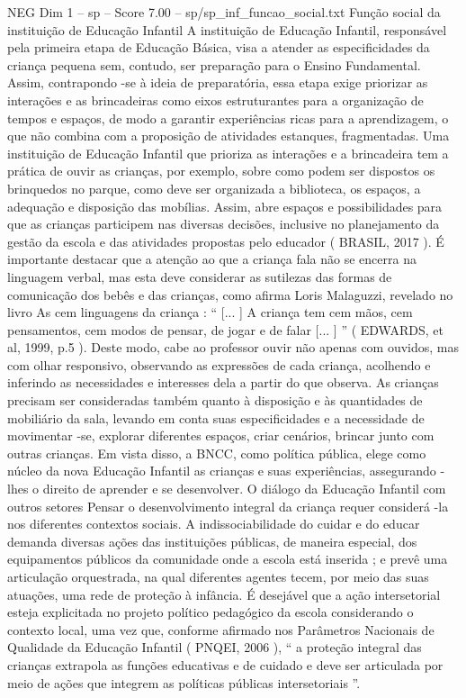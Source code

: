 \begin{textsample}{NEG Dim 1 – sp – Score 7.00 – sp/sp\_inf\_funcao\_social.txt}  \label{ex:f1_neg_175}
Função social da instituição de Educação Infantil A instituição de Educação Infantil, responsável pela primeira etapa de Educação Básica, visa a atender as especificidades da criança pequena sem, contudo, ser preparação para o Ensino Fundamental.
Assim, contrapondo -se à ideia de preparatória, essa etapa exige priorizar as interações e as brincadeiras como eixos estruturantes para a organização de tempos e espaços, de modo a garantir experiências ricas para a aprendizagem, o que não combina com a proposição de atividades estanques, fragmentadas.
Uma instituição de Educação Infantil que prioriza as interações e a brincadeira tem a prática de ouvir as crianças, por exemplo, sobre como podem ser dispostos os brinquedos no parque, como deve ser organizada a biblioteca, os espaços, a adequação e disposição das mobílias.
Assim, abre espaços e possibilidades para que as crianças participem nas diversas decisões, inclusive no planejamento da gestão da escola e das atividades propostas pelo educador ( BRASIL, 2017 ).
É importante destacar que a atenção ao que a criança fala não se encerra na linguagem verbal, mas esta deve considerar as sutilezas das formas de comunicação dos bebês e das crianças, como afirma Loris Malaguzzi, revelado no livro As cem linguagens da criança : “ [... ] A criança tem cem mãos, cem pensamentos, cem modos de pensar, de jogar e de falar [... ] ” ( EDWARDS, et al, 1999, p.5 ).
Deste modo, cabe ao professor ouvir não apenas com ouvidos, mas com olhar responsivo, observando as expressões de cada criança, acolhendo e inferindo as necessidades e interesses dela a partir do que observa.
As crianças precisam ser consideradas também quanto à disposição e às quantidades de mobiliário da sala, levando em conta suas especificidades e a necessidade de movimentar -se, explorar diferentes espaços, criar cenários, brincar junto com outras crianças.
Em vista disso, a BNCC, como política pública, elege como núcleo da nova Educação Infantil as crianças e suas experiências, assegurando -lhes o direito de aprender e se desenvolver.
O diálogo da Educação Infantil com outros setores Pensar o desenvolvimento integral da criança requer considerá -la nos diferentes contextos sociais.
A indissociabilidade do cuidar e do educar demanda diversas ações das instituições públicas, de maneira especial, dos equipamentos públicos da comunidade onde a escola está inserida ; e prevê uma articulação orquestrada, na qual diferentes agentes tecem, por meio das suas atuações, uma rede de proteção à infância.
É desejável que a ação intersetorial esteja explicitada no projeto político pedagógico da escola considerando o contexto local, uma vez que, conforme afirmado nos Parâmetros Nacionais de Qualidade da Educação Infantil ( PNQEI, 2006 ), “ a proteção integral das crianças extrapola as funções educativas e de cuidado e deve ser articulada por meio de ações que integrem as políticas públicas intersetoriais ”.

\end{textsample}
